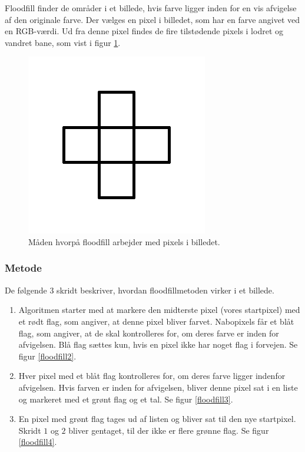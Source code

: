 {

Floodfill finder de områder i et billede, hvis farve ligger inden for en
vis afvigelse af den originale farve. Der vælges en pixel i billedet,
som har en farve angivet ved en RGB-værdi. Ud fra denne pixel findes de
fire tilstødende pixels i lodret og vandret bane, som vist i figur
\ref{floodfill1}.

\begin{figure}[!h]
    \begin{center}
        \includegraphics[scale=0.42,angle=0]{afsnit/vores_implementation/billeder/flood_fill/floodfill1}
    \end{center}
    \caption[]{Måden hvorpå floodfill arbejder med pixels i billedet.}
    \label{floodfill1}
\end{figure}

\subsubsection{Metode}
De følgende 3 skridt beskriver, hvordan floodfillmetoden virker i et
billede.

\begin{enumerate}
    \item Algoritmen starter med at markere den midterste pixel (vores
        startpixel) med et rødt flag, som angiver, at denne pixel bliver
        farvet. Nabopixels får et blåt flag, som angiver, at de skal
        kontrolleres for, om deres farve er inden for afvigelsen. Blå
        flag sættes kun, hvis en pixel ikke har noget flag i forvejen.
        Se figur \ref{floodfill2}.
    \item Hver pixel med et blåt flag kontrolleres for, om deres farve
        ligger indenfor afvigelsen. Hvis farven er inden for afvigelsen,
        bliver denne pixel sat i en liste og markeret med et grønt flag
        og et tal. Se figur \ref{floodfill3}.
    \item En pixel med grønt flag tages ud af listen og bliver sat til
        den nye startpixel. Skridt $1$ og $2$ bliver gentaget, til der
        ikke er flere grønne flag. Se figur \ref{floodfill4}.
\end{enumerate}

}
